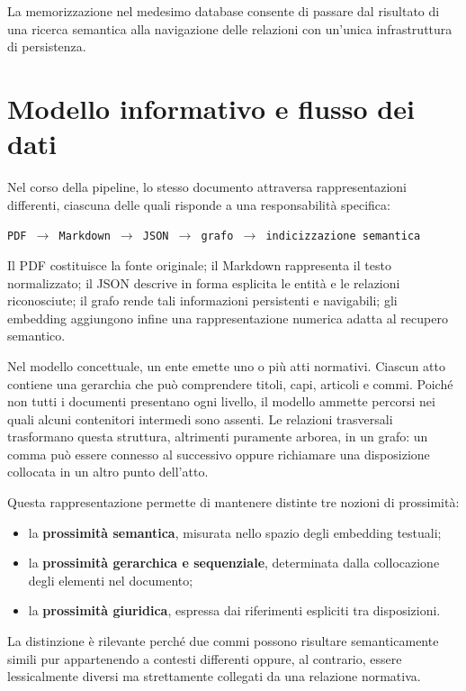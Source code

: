 La memorizzazione nel medesimo database consente di passare dal risultato di una ricerca semantica alla navigazione delle relazioni con un'unica infrastruttura di persistenza.

\section{Modello informativo e flusso dei dati}

Nel corso della pipeline, lo stesso documento attraversa rappresentazioni differenti, ciascuna delle quali risponde a una responsabilità specifica:

\begin{center}
\texttt{PDF $\rightarrow$ Markdown $\rightarrow$ JSON $\rightarrow$ grafo $\rightarrow$ indicizzazione semantica}
\end{center}

Il PDF costituisce la fonte originale; il Markdown rappresenta il testo normalizzato; il JSON descrive in forma esplicita le entità e le relazioni riconosciute; il grafo rende tali informazioni persistenti e navigabili; gli embedding aggiungono infine una rappresentazione numerica adatta al recupero semantico.

Nel modello concettuale, un ente emette uno o più atti normativi. Ciascun atto contiene una gerarchia che può comprendere titoli, capi, articoli e commi. Poiché non tutti i documenti presentano ogni livello, il modello ammette percorsi nei quali alcuni contenitori intermedi sono assenti. Le relazioni trasversali trasformano questa struttura, altrimenti puramente arborea, in un grafo: un comma può essere connesso al successivo oppure richiamare una disposizione collocata in un altro punto dell'atto.

Questa rappresentazione permette di mantenere distinte tre nozioni di prossimità:

\begin{itemize}
    \item la \textbf{prossimità semantica}, misurata nello spazio degli embedding testuali;
    \item la \textbf{prossimità gerarchica e sequenziale}, determinata dalla collocazione degli elementi nel documento;
    \item la \textbf{prossimità giuridica}, espressa dai riferimenti espliciti tra disposizioni.
\end{itemize}

La distinzione è rilevante perché due commi possono risultare semanticamente simili pur appartenendo a contesti differenti oppure, al contrario, essere lessicalmente diversi ma strettamente collegati da una relazione normativa.

